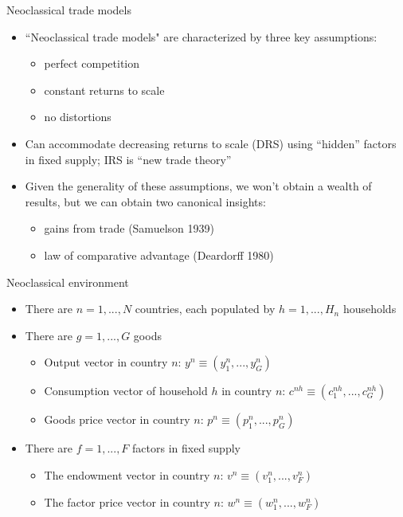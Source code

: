 \documentclass[10pt,notes=hide]{beamer}
\begin{document}
\begin{frame}{Neoclassical trade models}
\begin{itemize}
\item ``Neoclassical trade models" are characterized by three key
assumptions:
\begin{itemize}
	\item perfect competition
	\item constant returns to scale
	\item no distortions
\end{itemize}
\item Can accommodate decreasing returns to scale (DRS) using ``hidden'' factors in fixed supply;
IRS is ``new trade theory''
\item Given the generality of these assumptions, we won't obtain a wealth of results, but we can obtain two canonical insights: 
\begin{itemize}
	\item gains from trade (Samuelson 1939)
	\item law of comparative advantage (Deardorff 1980)
\end{itemize}
\end{itemize}
\end{frame}
\begin{frame}{Neoclassical environment}
\begin{itemize}
\item There are $n=1,...,N$ countries, each populated by $h=1,...,H_{n}$
households
\item There are $g=1,...,G$ goods
\begin{itemize}
\item Output vector in country $n$:
$y^{n} \equiv \left(y_{1}^{n},...,y_{G}^{n}\right) $
\item Consumption vector of household $h$ in country $n$:
$c^{nh} \equiv \left(c_{1}^{nh},...,c_{G}^{nh}\right) $
\item Goods price vector in country $n$:
$p^{n} \equiv \left(p_{1}^{n},...,p_{G}^{n}\right) $
\end{itemize}
\item There are $f=1,...,F$ factors in fixed supply
\begin{itemize}
\item The endowment vector in country $n$:
$v^{n} \equiv \left(v_{1}^{n},...,v_{F}^{n}\right) $
\item The factor price vector in country $n$:
$w^{n} \equiv \left(w_{1}^{n},...,w_{F}^{n}\right) $
\end{itemize}
\end{itemize}
\end{frame}
\end{document}
